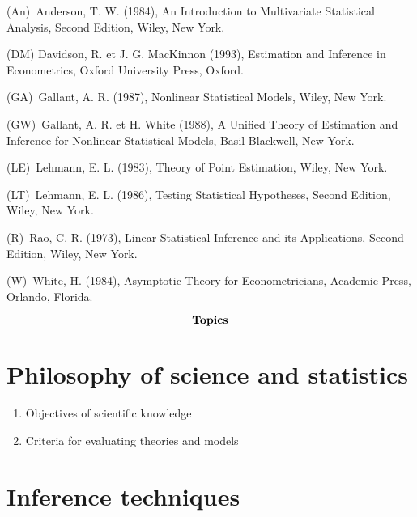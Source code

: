 \documentclass[titlepage,11pt,amstex]{article}
\begin{document}
(An)\ Anderson, T. W. (1984), An Introduction to Multivariate Statistical
Analysis, Second Edition, Wiley, New York.

(DM) Davidson, R. et J. G. MacKinnon (1993), Estimation and Inference in
Econometrics, Oxford University Press, Oxford.

(GA)\ Gallant, A. R. (1987), Nonlinear Statistical Models, Wiley, New York.

(GW)\ Gallant, A. R. et H. White (1988), A Unified Theory of Estimation and
Inference for Nonlinear Statistical Models, Basil Blackwell, New York.

(LE)\ Lehmann, E. L. (1983), Theory of Point Estimation, Wiley, New York.

(LT)\ Lehmann, E. L. (1986), Testing Statistical Hypotheses, Second Edition,
Wiley, New York.

(R)\ Rao, C. R. (1973), Linear Statistical Inference and its Applications,
Second Edition, Wiley, New York.

(W)\ White, H. (1984), Asymptotic Theory for Econometricians, Academic
Press, Orlando, Florida.

\begin{center}
\quad \newpage
\end{center}

\begin{equation*}
\text{\textbf{Topics}}
\end{equation*}

\section{\textbf{Philosophy of science and statistics \label{Philosophy of
science and statistics}}}

\begin{enumerate}
\item \label{Objectives}Objectives of scientific knowledge

\item \label{Criteria}Criteria for evaluating theories and models
\end{enumerate}

\section{Inference \textbf{techniques \label{Inference techniques}}}
\end{document}

